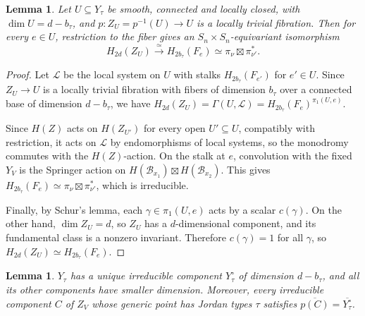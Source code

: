 \documentclass[12pt,a4paper]{article}
\theoremstyle{plain}
\newtheorem{lemma}[thm]{Lemma}
\theoremstyle{definition}
\theoremstyle{remark}
\newcommand{\cB}{\mathcal{B}}
\newcommand{\cL}{\mathcal{L}}
\begin{document}
    \begin{lemma}\label{lem:trivial}
        Let $U\subseteq Y_\tau$ be smooth, connected and locally closed, with $\dim U=d-b_\tau$, and $p\colon Z_U=p^{-1}(U)\to U$ is a locally trivial fibration. Then for every $e\in U$,
        restriction to the fiber gives an $S_n\times S_n$-equivariant isomorphism
        \[
        H_{2d}(Z_U)\xrightarrow{\simeq}H_{2b_\tau}(F_e)\simeq\pi_\nu\boxtimes\pi_{\nu'}^*.
        \]
    \end{lemma}
    
    \begin{proof}
        Let $\mathcal L$ be the local system on $U$ with stalks $H_{2b_\tau}(F_{e'})$ for $e'\in U$. Since $Z_U\to U$ is a locally trivial fibration with fibers of
        dimension $b_\tau$ over a connected base of dimension $d-b_\tau$, we have $H_{2d}(Z_U)= \Gamma(U,\mathcal L)=H_{2b_\tau}(F_e)^{\pi_1(U,e)}$.
        
        Since $H(Z)$ acts on $H(Z_{U'})$ for every open $U'\subseteq U$, compatibly with restriction, it acts on $\cL$ by endomorphisms of local systems, so the monodromy commutes with the $H(Z)$-action. On the stalk at $e$, convolution with the fixed $Y_V$ is the Springer action on $H(\cB_{x_1})\boxtimes H(\cB_{x_2})$. This gives $H_{2b_\tau}(F_e) \simeq \pi_\nu\boxtimes\pi_{\nu'}^*$, which is
        irreducible.
        
        Finally, by Schur's lemma, each $\gamma\in\pi_1(U,e)$ acts by a scalar $c(\gamma)$. On the other hand, $\dim Z_U=d$, so $Z_U$ has a $d$-dimensional component, and its fundamental class is a nonzero invariant. Therefore $c(\gamma)=1$ for all $\gamma$, so $H_{2d}(Z_U) \simeq H_{2b_\tau}(F_e)$.
    \end{proof}

    \begin{lemma}\label{lem:irreducibility}
        $Y_\tau$ has a unique irreducible component $Y_\tau^{\circ}$ of dimension $d-b_\tau$, and all
        its other components have smaller dimension. Moreover, every irreducible component $C$ of
        $Z_V$ whose generic point has Jordan types $\tau$ satisfies $\overline{p(C)} = \overline{Y_\tau^\circ}$.
    \end{lemma}
    
\end{document}
